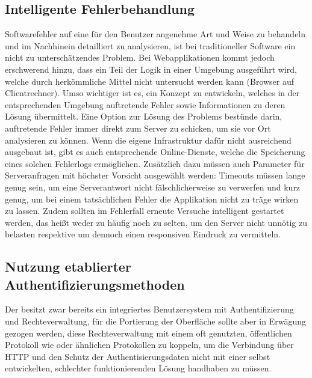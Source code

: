\subsection{Intelligente Fehlerbehandlung}
Softwarefehler auf eine für den Benutzer angenehme Art und Weise zu behandeln und im Nachhinein detailliert zu analysieren, ist bei traditioneller Software ein nicht zu unterschätzendes Problem. Bei Webapplikationen kommt jedoch erschwerend hinzu, dass ein Teil der Logik in einer Umgebung ausgeführt wird, welche durch herkömmliche Mittel nicht untersucht werden kann (Browser auf Clientrechner). Umso wichtiger ist es, ein Konzept zu entwickeln, welches in der entsprechenden Umgebung auftretende Fehler sowie Informationen zu deren Lösung übermittelt. Eine Option zur Lösung des Problems bestünde darin, auftretende Fehler immer direkt zum Server zu schicken, um sie vor Ort analysieren zu können. Wenn die eigene Infrastruktur dafür nicht ausreichend ausgebaut ist, gibt es auch entsprechende Online-Dienste, welche die Speicherung eines solchen Fehlerlogs ermöglichen. Zusätzlich dazu müssen auch Parameter für Serveranfragen mit höchster Vorsicht ausgewählt werden: Timeouts müssen lange genug sein, um eine Serverantwort nicht fälschlicherweise zu verwerfen und kurz genug, um bei einem tatsächlichen Fehler die Applikation nicht zu träge wirken zu lassen. Zudem sollten im Fehlerfall erneute Versuche intelligent gestartet werden, das heißt weder zu häufig noch zu selten, um den Server nicht unnötig zu belasten respektive um dennoch einen responsiven Eindruck zu vermitteln.

\subsection{Nutzung etablierter Authentifizierungsmethoden}
Der  besitzt zwar bereits ein integriertes Benutzersystem mit Authentifizierung und Rechteverwaltung, für die Portierung der Oberfläche sollte aber in Erwägung gezogen werden, diese Rechteverwaltung mit einem oft genutzten, öffentlichen Protokoll wie  oder ähnlichen Protokollen zu koppeln, um die Verbindung über HTTP und den Schutz der Authentisierungsdaten nicht mit einer selbst entwickelten, schlechter funktionierenden Lösung handhaben zu müssen.

